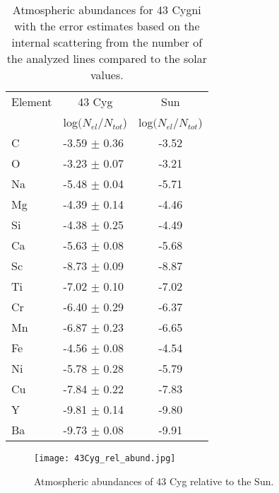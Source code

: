 \documentclass{aa}
\begin{document}
\begin{table}
\caption{Atmospheric abundances for 43 Cygni with the error estimates based on the internal scattering from the number of the analyzed lines compared to the solar values.}
\label{tab:abund}
\begin{center}
\begin{tabular}{llc}
\hline
\hline
\multicolumn{1}{c}{Element} & \multicolumn{1}{c}{43 Cyg} & \multicolumn{1}{c}{Sun} \\
\multicolumn{1}{c}{ } & \multicolumn{1}{c}{log$(N_{el} / N_{tot}$)} & \multicolumn{1}{c}{log$(N_{el} / N_{tot}$)} \\
\hline
C  & -3.59 $\pm$ 0.36   &  -3.52  \\ 
O & -3.23 $\pm$ 0.07 & -3.21 \\ 
Na & -5.48  $\pm$ 0.04 & -5.71 \\ 
Mg & -4.39 $\pm$ 0.14   & -4.46  \\ 
Si & -4.38  $\pm$ 0.25 & -4.49 \\ 
Ca & -5.63  $\pm$ 0.08 & -5.68 \\ 
Sc &  -8.73 $\pm$ 0.09   &  -8.87 \\ 
Ti & -7.02 $\pm$ 0.10 & -7.02 \\ 
Cr &  -6.40 $\pm$ 0.29  & -6.37 \\ 
Mn &  -6.87 $\pm$ 0.23  & -6.65  \\ 
Fe & -4.56 $\pm$ 0.08 & -4.54 \\ 
Ni & -5.78 $\pm$ 0.28 & -5.79 \\ 
Cu & -7.84 $\pm$ 0.22   & -7.83 \\ 
Y &  -9.81 $\pm$ 0.14   & -9.80  \\ 
Ba &  -9.73 $\pm$ 0.08  & -9.91 \\ 
\hline
\end{tabular}
\end{center}
\end{table}

\begin{figure}
	\begin{center}
	\texttt{[image: 43Cyg\_rel\_abund.jpg]}
    \caption{Atmospheric abundances of 43 Cyg relative to the Sun.}
    \label{fig:abund}
	\end{center}
\end{figure}
\end{document}
